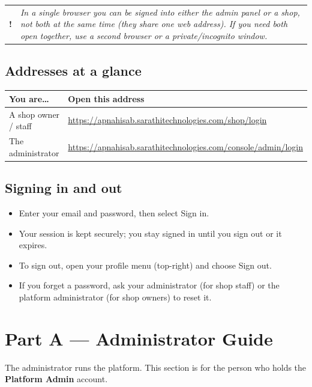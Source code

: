\documentclass[11pt,a4paper]{article}
\makeatletter
\newcommand{\role}[1]{\textbf{\color{brand}#1}}
\newcommand{\menu}[1]{\textsf{#1}}
\newenvironment{note}
  {\par\medskip\noindent\begin{tabular}{@{}p{0.03\textwidth}p{0.9\textwidth}@{}}
   \textbf{!} & \itshape}
  {\end{tabular}\par\medskip}
\makeatother
\begin{document}
\begin{note}
In a single browser you can be signed into \emph{either} the admin panel or a
shop, not both at the same time (they share one web address). If you need both
open together, use a second browser or a private/incognito window.
\end{note}

\subsection{Addresses at a glance}

\begin{center}
\begin{tabularx}{\textwidth}{@{}p{}L@{}}
\toprule
\textbf{You are\ldots} & \textbf{Open this address} \\
\midrule
A shop owner / staff & \url{https://apnahisab.sarathitechnologies.com/shop/login} \\[3pt]
The administrator    & \url{https://apnahisab.sarathitechnologies.com/console/admin/login} \\
\bottomrule
\end{tabularx}
\end{center}

\subsection{Signing in and out}
\begin{itemize}
  \item Enter your email and password, then select \menu{Sign in}.
  \item Your session is kept securely; you stay signed in until you sign out or
        it expires.
  \item To sign out, open your profile menu (top-right) and choose \menu{Sign out}.
  \item If you forget a password, ask your administrator (for shop staff) or the
        platform administrator (for shop owners) to reset it.
\end{itemize}

\clearpage
\section{Part A --- Administrator Guide}

The administrator runs the platform. This section is for the person who holds the
\role{Platform Admin} account.
\end{document}
